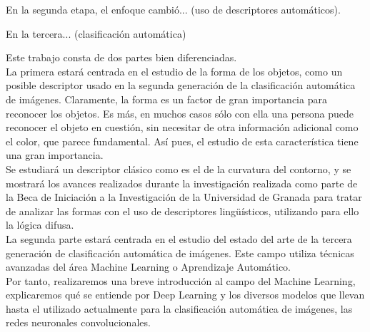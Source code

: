 En la segunda etapa, el enfoque cambió... (uso de descriptores automáticos).

En la tercera... (clasificación automática)

Este trabajo consta de dos partes bien diferenciadas.\\

La primera estará centrada en el estudio de la forma de los objetos, como un posible descriptor usado en la segunda generación de la clasificación automática de imágenes. Claramente, la forma es un factor de gran importancia para reconocer los objetos. Es más, en muchos casos sólo con ella una persona puede reconocer el objeto en cuestión, sin necesitar de otra información adicional como el color, que parece fundamental. Así pues, el estudio de esta característica tiene una gran importancia.\\

Se estudiará un descriptor clásico como es el de la curvatura del contorno, y se mostrará los avances realizados durante la investigación realizada como parte de la Beca de Iniciación a la Investigación de la Universidad de Granada para tratar de analizar las formas con el uso de descriptores lingüísticos, utilizando para ello la lógica difusa.\\

La segunda parte estará centrada en el estudio del estado del arte de la tercera generación de clasificación automática de imágenes. Este campo utiliza técnicas avanzadas del área Machine Learning o Aprendizaje Automático.\\

Por tanto, realizaremos una breve introducción al campo del Machine Learning, explicaremos qué se entiende por Deep Learning y los diversos modelos que llevan hasta el utilizado actualmente para la clasificación automática de imágenes, las redes neuronales convolucionales.\\
